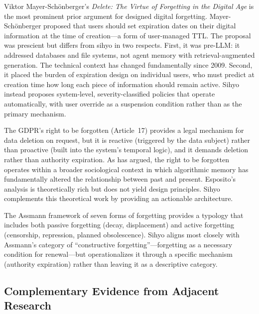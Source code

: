 \documentclass[12pt]{article}
\begin{document}
Viktor Mayer-Sch\"{o}nberger's \emph{Delete: The Virtue of Forgetting in the Digital Age} \citep{mayer-schonberger2009} is the most prominent prior argument for designed digital forgetting. Mayer-Sch\"{o}nberger proposed that users should set expiration dates on their digital information at the time of creation---a form of user-managed TTL. The proposal was prescient but differs from sihyo in two respects. First, it was pre-LLM: it addressed databases and file systems, not agent memory with retrieval-augmented generation. The technical context has changed fundamentally since 2009. Second, it placed the burden of expiration design on individual users, who must predict at creation time how long each piece of information should remain active. Sihyo instead proposes system-level, severity-classified policies that operate automatically, with user override as a suspension condition rather than as the primary mechanism.

The GDPR's right to be forgotten (Article~17) provides a legal mechanism for data deletion on request, but it is reactive (triggered by the data subject) rather than proactive (built into the system's temporal logic), and it demands deletion rather than authority expiration. As \citet{esposito2017} has argued, the right to be forgotten operates within a broader sociological context in which algorithmic memory has fundamentally altered the relationship between past and present. Esposito's analysis is theoretically rich but does not yield design principles. Sihyo complements this theoretical work by providing an actionable architecture.

The Assmann framework of seven forms of forgetting \citep{assmann-forgetting} provides a typology that includes both passive forgetting (decay, displacement) and active forgetting (censorship, repression, planned obsolescence). Sihyo aligns most closely with Assmann's category of ``constructive forgetting''---forgetting as a necessary condition for renewal---but operationalizes it through a specific mechanism (authority expiration) rather than leaving it as a descriptive category.

\subsection{Complementary Evidence from Adjacent Research}
\label{sec:complementary-evidence}
\end{document}
